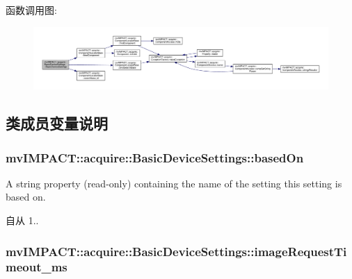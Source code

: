 函数调用图\+:
\nopagebreak
\begin{figure}[H]
\begin{center}
\leavevmode
\includegraphics[width=350pt]{classmv_i_m_p_a_c_t_1_1acquire_1_1_basic_device_settings_a4956794c96ca7afea6910d6fdbfd3257_cgraph}
\end{center}
\end{figure}




\subsection{类成员变量说明}
\hypertarget{classmv_i_m_p_a_c_t_1_1acquire_1_1_basic_device_settings_aa6ca2a2fe4794fbc5bf638b48440eac1}{
\subsubsection[{based\+On}]{ mv\+I\+M\+P\+A\+C\+T\+::acquire\+::\+Basic\+Device\+Settings\+::based\+On}}\label{classmv_i_m_p_a_c_t_1_1acquire_1_1_basic_device_settings_aa6ca2a2fe4794fbc5bf638b48440eac1}


A string property {\bfseries }(read-\/only) containing the name of the setting this setting is based on. 

\begin{DoxySince}{自从}
1.. 
\end{DoxySince}
\hypertarget{classmv_i_m_p_a_c_t_1_1acquire_1_1_basic_device_settings_a5bbc413a2afe5a1d8eb673ba14047ae2}{
\subsubsection[{image\+Request\+Timeout\+\_\+ms}]{ mv\+I\+M\+P\+A\+C\+T\+::acquire\+::\+Basic\+Device\+Settings\+::image\+Request\+Timeout\+\_\+ms}}\label{classmv_i_m_p_a_c_t_1_1acquire_1_1_basic_device_settings_a5bbc413a2afe5a1d8eb673ba14047ae2}



